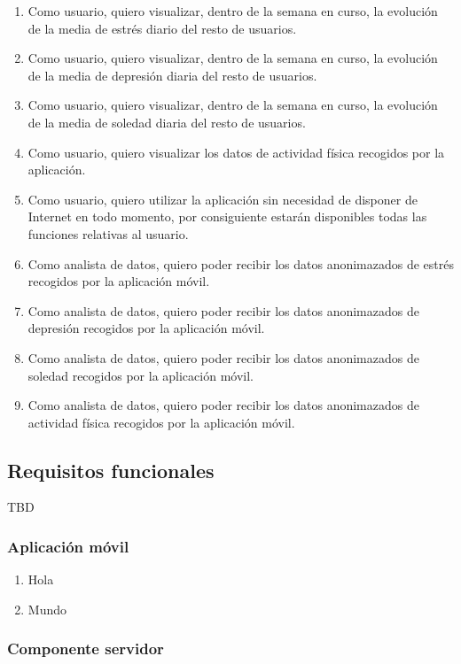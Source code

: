 \begin{enumerate}[label=\textbf{\texttt{RU-\arabic*}}]
            \item Como usuario, quiero visualizar, dentro de la semana en curso, la evolución de la media de estrés diario del resto de usuarios.
            \item Como usuario, quiero visualizar, dentro de la semana en curso, la evolución de la media de depresión diaria del resto de usuarios.
            \item Como usuario, quiero visualizar, dentro de la semana en curso, la evolución de la media de soledad diaria del resto de usuarios.
            \item Como usuario, quiero visualizar los datos de actividad física recogidos por la aplicación.
            \item Como usuario, quiero utilizar la aplicación sin necesidad de disponer de Internet en todo momento, por consiguiente estarán disponibles todas las funciones relativas al usuario.
            \item Como analista de datos, quiero poder recibir los datos anonimazados de estrés recogidos por la aplicación móvil.
            \item Como analista de datos, quiero poder recibir los datos anonimazados de depresión recogidos por la aplicación móvil.
            \item Como analista de datos, quiero poder recibir los datos anonimazados de soledad recogidos por la aplicación móvil.
            \item Como analista de datos, quiero poder recibir los datos anonimazados de actividad física recogidos por la aplicación móvil.
        \end{enumerate}
    
    \subsection{Requisitos funcionales}
        TBD

        \subsubsection{Aplicación móvil}

        \begin{enumerate}[label=\textbf{\texttt{RF-\arabic*}}]
            \item Hola
            \item Mundo
        \end{enumerate}

        \subsubsection{Componente servidor}
    

